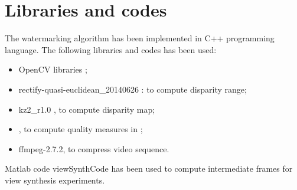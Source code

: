 \appendix
\chapter{Libraries and codes}

The watermarking algorithm has been implemented in C++ programming language. The following libraries and codes has been used:
\begin{itemize}
\item OpenCV libraries  ;
\item rectify-quasi-euclidean\_20140626 \cite{}: to compute disparity range;
\item kz2\_r1.0 \cite{}, to compute disparity map;
\item  \cite{}, to compute quality measures in \cite{};
\item ffmpeg-2.7.2, to compress video sequence.
\end{itemize}

Matlab code viewSynthCode \cite{} has been used to compute intermediate frames for view synthesis experiments.
 